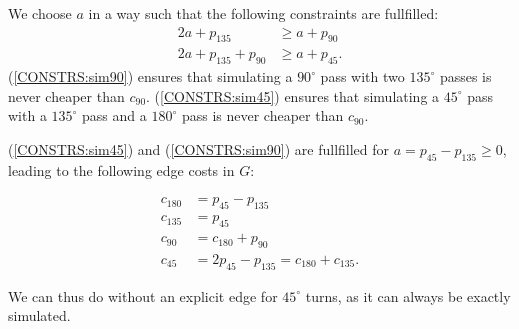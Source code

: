\documentclass{sig-alternate-sigmod09}
\begin{document}
We choose $a$ in a way such that the following constraints are fullfilled:
\begin{align}[h]
2a + p_{135} &\geq a + p_{90} \label{CONSTRS:sim90}\\
2a + p_{135} + p_{90} &\geq a + p_{45}\label{CONSTRS:sim45}.
\end{align}
(\ref{CONSTRS:sim90}) ensures that simulating a $90^{\circ}$ pass with two $135^{\circ}$ passes is never cheaper than $c_{90}$. (\ref{CONSTRS:sim45}) ensures that simulating a $45^{\circ}$ pass with a $135^{\circ}$ pass and a $180^{\circ}$ pass is never cheaper than $c_{90}$.

(\ref{CONSTRS:sim45}) and (\ref{CONSTRS:sim90}) are fullfilled for $a = p_{45} - p_{135} \geq 0$, leading to the following edge costs in $G$:

\begin{align}
c_{180} &= p_{45} - p_{135} \\
c_{135} &= p_{45} \\
c_{90} &= c_{180} + p_{90} \\
c_{45} &= 2p_{45} - p_{135} = c_{180} + c_{135}.
\end{align}

We can thus do without an explicit edge for $45^{\circ}$ turns, as it can always be exactly simulated.
\end{document}
